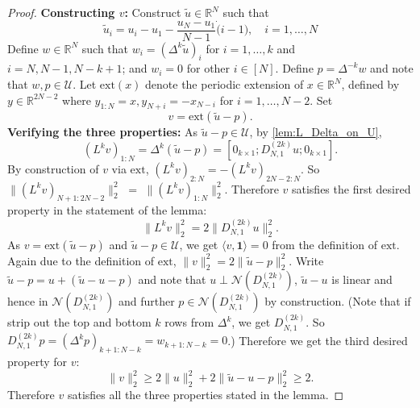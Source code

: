 \documentclass[ejs,noshowframe]{imsart}
\theoremstyle{plain}
\theoremstyle{definition}
\newcommand{\R}{\mathbb{R}}
\newcommand{\cN}{\mathcal{N}}
\newcommand{\cU}{\mathcal{U}}
\newcommand{\one}{\mathbf{1}}
\renewcommand{\tilde}{\widetilde}
\begin{document}
\begin{appendix}
\begin{proof}
	
	\textbf{Constructing $v$:}
	Construct $\tilde u \in \R^N$ such that
	\[
	 \tilde{u}_i = u_i - u_1 - \frac{u_N - u_1}{N-1} \dot (i-1), \quad i = 
	 1,\dots, N
	\]
	Define $ w \in \R^N$ such that 
	$w_i = (\Delta^k \tilde u)_i$ 
	for $i=1,\dots, k$ and $i=N, N-1, N-k+1$; and $w_i = 0$ for other $i \in [N]$.
	Define $p = \Delta^{-k} w$ and note that $w, p \in \cU$.
		Let $\mathrm{ext}(x)$ denote the periodic extension of $x \in \R^N$,
	defined by $y \in \R^{2N-2}$ where $ y_{1:N} = x, y_{N+i} = -x_{N-i}$ for 
	$i=1,\dots,N-2$.
	Set
	$$v = \mathrm{ext}(\tilde u - p).$$ 
	\textbf{Verifying the three properties:}
	As $\tilde u - p \in \cU$, by 
	\autoref{lem:L_Delta_on_U}, 
	 \[
	 (L^k v)_{1:N}  = \Delta^k (\tilde u - p) = [0_{k\times 1}; D^{(2k)}_{N,1} u; 
	 0_{k\times 1}].
	 \]
	 By construction of $v$ via $\mathrm{ext}$, 
	 $(L^k v)_{2:N} = - (L^k v)_{2N-2:N}$. So
	 $\| (L^k v)_{N+1:2N-2} \|_2^2$ $=$ $\| (L^k v)_{1:N} \|_2^2$.
	 Therefore $v$ satisfies the first desired property in the statement of the 
	 lemma:
	 \[
		\| L^k v \|_2^2 = 2 \| D^{(2k)}_{N,1} u \|_2^2.
	 \]
	 As $v = \mathrm{ext}(\tilde u - p)$ and $\tilde u - p \in \cU$, we get 
	 $\langle v, \one \rangle = 0$ from the definition of $\mathrm{ext}$.
	 Again due to the definition of $\mathrm{ext}$, $\| v \|_2^2 = 2 \| \tilde u 
	 - p \|_2^2$. 
	 Write $\tilde u - p = u + 
	 (\tilde u - u - p)$ and note that $u \perp \cN(D^{(2k)}_{N,1})$, 
	 $\tilde u - u$ is linear and hence in $\cN(D^{(2k)}_{N,1})$ and further 
	 $p \in \cN(D^{(2k)}_{N,1})$ by construction. (Note that if strip out the top 
	 and bottom $k$ rows from $\Delta^k$, we get $D^{(2k)}_{N,1}$. So 
	 $D^{(2k)}_{N,1} p = (\Delta^k p)_{k+1:N-k} = w_{k+1:N-k} = 0$.)
	 Therefore we get the third desired property for $v$:
	 \[
	 \| v \|_2^2 \geq 2 \| u \|_2^2 + 2 \| 	 \tilde u - u - p \|_2^2 \geq 2.
	 \]	 
	 Therefore $v$ satisfies all the three properties stated in the lemma.
\end{proof}


\end{appendix}
\end{document}
